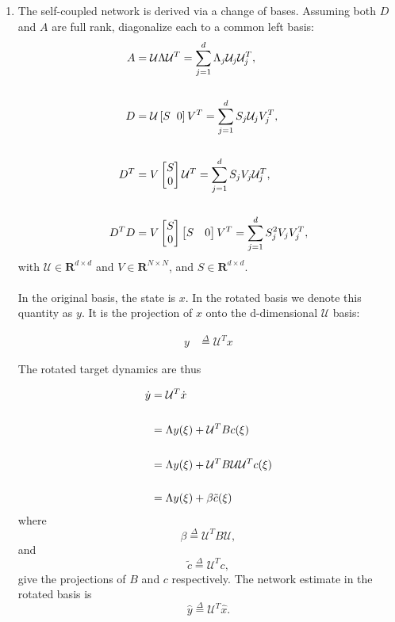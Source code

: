 \begin{enumerate}
\clearpage

\item The self-coupled network is derived via a change of bases. Assuming both $D$ and $A$ are full rank, diagonalize each to a common left basis:
\begin{align*}
    A &= \mathcal{U} \Lambda \mathcal{U}^T = \sum_{j=1}^d \Lambda_j \mathcal{U}_j \mathcal{U}_j^T,\\
    \\
    D &= \mathcal{U} \left[S \hspace{2mm} 0 \right]  V^T = \sum_{j=1}^d S_j \mathcal{U}_j  V_j^T,\\
    \\
    D^T &= V \begin{bmatrix} S \\ 0\end{bmatrix} \mathcal{U}^T = \sum_{j=1}^d S_j V_j  \mathcal{U}_j^T, \\
    \\
    D^T D  &= V \begin{bmatrix} S \\ 0\end{bmatrix} \begin{bmatrix} S & 0\end{bmatrix} V^T
     = \sum_{j=1}^d S_j^2 V_j V_j^T , 
\end{align*}
with $\mathcal{U} \in \mathbf{R}^{d \times d}$ and $V \in \mathbf{R}^{N \times N}$, and $S \in \mathbf{R}^{d \times d }$. \\
\\

In the original basis, the state is $x$. In the rotated basis we denote this quantity as $y$. It is the projection of $x$ onto the d-dimensional $\mathcal{U}$ basis:

\begin{align}
\label{eq:definition_rotated_state_space}
y &\overset{\Delta}{=} \mathcal{U}^T x 
\end{align}

The rotated target dynamics are thus

\begin{align}
\label{eq:rotated_targed_dynamical_system}
\dot{y} &= \mathcal{U}^T \dot{x} \notag
\\ \notag
\\ \notag
&= 
\Lambda y (\xi)
+
\mathcal{U}^T B c(\xi)
\\ \notag
\\ \notag
&= 
\Lambda y (\xi)
+
\mathcal{U}^T B \mathcal{U} \mathcal{U}^T c(\xi) \notag
\\ \notag
\\ 
&=
\Lambda y (\xi)
+
\beta \tilde{c}(\xi)
\end{align}
where  
$$
\beta \overset{\Delta}{=} \mathcal{U}^T B \mathcal{U},  
$$
and
$$
\tilde{c} \overset{\Delta}{=} \mathcal{U}^T c,
$$
give the projections of $B$ and $c$ respectively.
The network estimate in the rotated basis is 
$$
\hat{y} \overset{\Delta}{=} \mathcal{U}^T \hat{x}.
$$


\end{enumerate}
